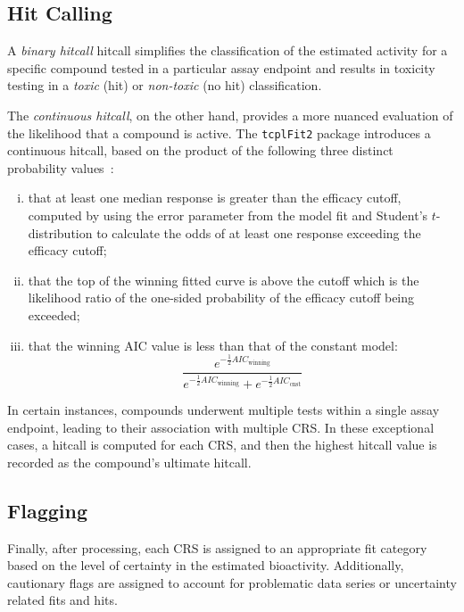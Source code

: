 \subsection{Hit Calling}
A \emph{binary hitcall} hitcall simplifies the classification of the estimated activity for a specific compound tested in a particular assay endpoint and results in toxicity testing in a \emph{toxic} (hit) or \emph{non-toxic} (no hit) classification.

The \emph{continuous hitcall}, on the other hand, provides a more nuanced evaluation of the likelihood that a compound is active. The \texttt{tcplFit2} package introduces a continuous hitcall, based on the product of the following three distinct probability values~\cite{sheffield2021}:

\begin{enumerate}[i.]
    \item that at least one median response is greater than the efficacy cutoff, computed by using the error parameter from the model fit and Student's $t$-distribution to calculate the odds of at least one response exceeding the efficacy cutoff;
    \item that the top of the winning fitted curve is above the cutoff which is the likelihood ratio of the one-sided probability of the efficacy cutoff being exceeded;
    \item that the winning AIC value is less than that of the constant model:
    \begin{equation}
    \frac{e^{-\frac{1}{2}AIC_{\text{winning}}}}{e^{-\frac{1}{2}AIC_{\text{winning}}} + e^{-\frac{1}{2}AIC_{\text{cnst}}} }
    \end{equation}
\end{enumerate}

In certain instances, compounds underwent multiple tests within a single assay endpoint, leading to their association with multiple CRS. In these exceptional cases, a hitcall is computed for each CRS, and then the highest hitcall value is recorded as the compound's ultimate hitcall.

\subsection{Flagging}
Finally, after processing, each CRS is assigned to an appropriate fit category based on the level of certainty in the estimated bioactivity. Additionally, cautionary flags are assigned to account for problematic data series or uncertainty related fits and hits.


